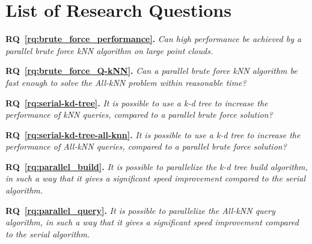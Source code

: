 
\tableofcontents
{}
\clearpage

\listoftables
{}
\clearpage

\listoffigures
{}
\clearpage

\listofalgorithms
{}
\clearpage

\chapter*{List of Research Questions} %
\label{sec:section_name}


\textbf{RQ~\ref{rq:brute_force_performance}.} \emph{Can high performance be achieved by a parallel brute force kNN algorithm on large point clouds.}

\textbf{RQ~\ref{rq:brute_force_Q-kNN}.} \emph{Can a parallel brute force kNN algorithm be fast enough to solve the All-kNN problem within reasonable time?}

\textbf{RQ~\ref{rq:serial-kd-tree}.} \emph{It is possible to use a k-d tree to increase the performance of kNN queries, compared to a parallel brute force solution?}

\textbf{RQ~\ref{rq:serial-kd-tree-all-knn}.} \emph{It is possible to use a k-d tree to increase the performance of All-kNN queries, compared to a parallel brute force solution?}

\textbf{RQ~\ref{rq:parallel_build}.} \emph{It is possible to parallelize the k-d tree build algorithm, in such a way that it gives a significant speed improvement compared to the serial algorithm.}

\textbf{RQ~\ref{rq:parallel_query}.} \emph{It is possible to parallelize the All-kNN query algorithm, in such a way that it gives a significant speed improvement compared to the serial algorithm.}

\clearpage
